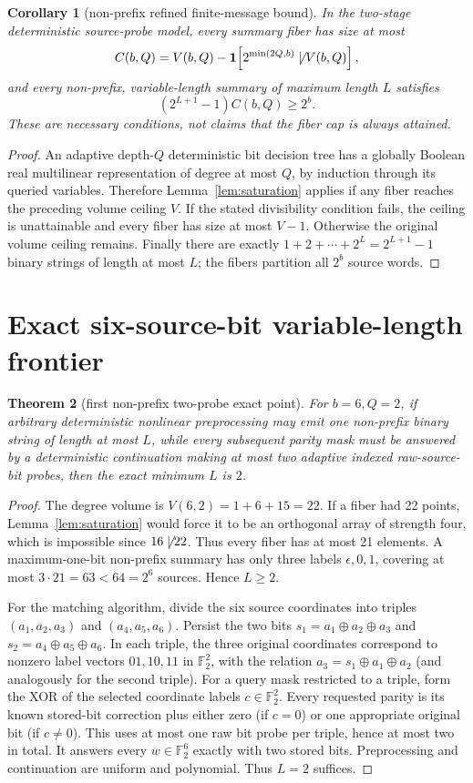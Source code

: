 \documentclass[10pt]{article}
\newtheorem{theorem}{Theorem}
\newtheorem{corollary}[theorem]{Corollary}
\newcommand{\F}{\mathbb F_2}
\begin{document}
\begin{corollary}[non-prefix refined finite-message bound]\label{cor:cap}
In the two-stage deterministic source-probe model, every summary fiber has size at most
\[
 C(b,Q)=V(b,Q)-\mathbf 1\!\left[2^{\min(2Q,b)}\not\mid V(b,Q)\right],
\]
and every non-prefix, variable-length summary of maximum length \(L\) satisfies
\[
\boxed{(2^{L+1}-1)C(b,Q)\ge2^b.}
\]
These are necessary conditions, not claims that the fiber cap is always attained.
\end{corollary}
\begin{proof}
An adaptive depth-\(Q\) deterministic bit decision tree has a globally Boolean real multilinear representation of degree at most \(Q\), by induction through its queried variables. Therefore Lemma~\ref{lem:saturation} applies if any fiber reaches the preceding volume ceiling \(V\). If the stated divisibility condition fails, the ceiling is unattainable and every fiber has size at most \(V-1\). Otherwise the original volume ceiling remains. Finally there are exactly \(1+2+\cdots+2^L=2^{L+1}-1\) binary strings of length at most \(L\); the fibers partition all \(2^b\) source words.
\end{proof}

\section{Exact six-source-bit variable-length frontier}
\begin{theorem}[first non-prefix two-probe exact point]\label{th:6}
For \(b=6,Q=2\), if arbitrary deterministic nonlinear preprocessing may emit one non-prefix binary string of length at most \(L\), while every subsequent parity mask must be answered by a deterministic continuation making at most two adaptive indexed raw-source-bit probes, then the exact minimum \(L\) is \(2\).
\end{theorem}
\begin{proof}
The degree volume is \(V(6,2)=1+6+15=22\). If a fiber had 22 points, Lemma~\ref{lem:saturation} would force it to be an orthogonal array of strength four, which is impossible since \(16\not\mid22\). Thus every fiber has at most 21 elements. A maximum-one-bit non-prefix summary has only three labels \(\epsilon,0,1\), covering at most \(3\cdot21=63<64=2^6\) sources. Hence \(L\ge2\).

For the matching algorithm, divide the six source coordinates into triples \((a_1,a_2,a_3)\) and \((a_4,a_5,a_6)\). Persist the two bits \(s_1=a_1\oplus a_2\oplus a_3\) and \(s_2=a_4\oplus a_5\oplus a_6\). In each triple, the three original coordinates correspond to nonzero label vectors \(01,10,11\) in \(\F^2\), with the relation \(a_3=s_1\oplus a_1\oplus a_2\) (and analogously for the second triple). For a query mask restricted to a triple, form the XOR of the selected coordinate labels \(c\in\F^2\). Every requested parity is its known stored-bit correction plus either zero (if \(c=0\)) or one appropriate original bit (if \(c\ne0\)). This uses at most one raw bit probe per triple, hence at most two in total. It answers every \(w\in\F^6\) exactly with two stored bits. Preprocessing and continuation are uniform and polynomial. Thus \(L=2\) suffices.
\end{proof}
\end{document}
